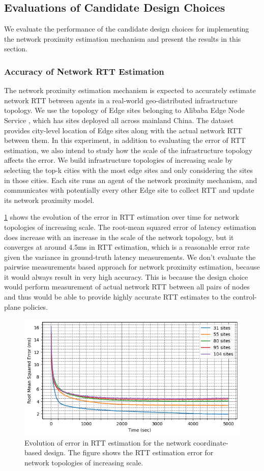 \subsection{Evaluations of Candidate Design Choices} 
We evaluate the performance of the candidate design choices for implementing the network proximity estimation mechanism and present the results in this section.

\subsubsection{Accuracy of Network RTT Estimation}
\label{sec:nw_rtt_error}
The network proximity estimation mechanism is expected to accurately estimate network RTT between agents in a real-world geo-distributed infrastructure topology. We use the topology of Edge sites belonging to Alibaba Edge Node Service \cite{}, which has sites deployed all across mainland China. The dataset provides city-level location of Edge sites along with the actual network RTT between them. In this experiment, in addition to evaluating the error of RTT estimation, we also intend to study how the scale of the infrastructure topology affects the error. We build infrastructure topologies of increasing scale by selecting the top-k cities with the most edge sites and only considering the sites in those cities. Each site runs an agent of the network proximity mechanism, and communicates with potentially every other Edge site to collect RTT and update its network proximity model.
\par \cref{fig:nw_coord_error} shows the evolution of the error in RTT estimation over time for network topologies of increasing scale. The root-mean squared error of latency estimation does increase with an increase in the scale of the network topology, but it converges at around 4.5ms in RTT estimation, which is a reasonable error rate given the variance in ground-truth latency measurements. We don't evaluate the pairwise measurements based approach for network proximity estimation, because it would always result in very high accuracy. This is because the design choice would perform measurement of actual network RTT between all pairs of nodes and thus would be able to provide highly accurate RTT estimates to the control-plane policies.
\begin{figure}
\centering
\includegraphics[width=0.75\linewidth]{figures/design_space/nw_prox/error.png}
\caption{Evolution of error in RTT estimation for the network coordinate-based design. The figure shows the RTT estimation error for network topologies of increasing scale.}
\label{fig:nw_coord_error}
\end{figure}

